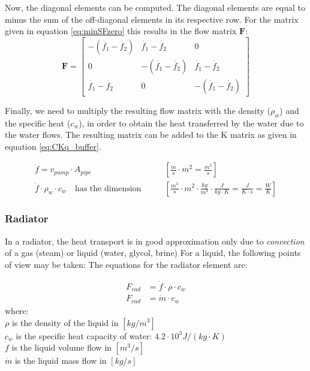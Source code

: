 Now, the diagonal elements can be computed. The diagonal elements are equal to minus the sum of the off-diagonal elements in its respective row. For the matrix given in equation \ref{eq:minSFzero} this results in the flow matrix $\mathbf{F}$:
\begin{equation}
	\mathbf{F} =  \begin{bmatrix}
		-(\dot{f_1}-\dot{f_2})   & \dot{f_1}-\dot{f_2} & 0 \\
        0     & -(\dot{f_1}-\dot{f_2})       & \dot{f_1}-\dot{f_2} \\
     \dot{f_1}-\dot{f_2}  & 0       & -(\dot{f_1}-\dot{f_2})     
	\end{bmatrix}
	\label{eq:flowmatrix}
\end{equation}

Finally, we need to multiply the resulting flow matrix with the density ($\rho_{w}$) and the specific heat ($c_{w}$), in order to obtain the heat transferred by the water due to the water flows. The resulting matrix can be added to the K matrix as given in equation \ref{eq:CKq_buffer}.

\begin{equation}
	\begin{aligned}
		\dot{f} = v_{pump} \cdot A_{pipe} \qquad & \left[ \frac{m}{s} \cdot m^2 = \frac{m^3}{s}\right] \\
		\dot{f} \cdot \rho_w \cdot c_w \quad \text{has the dimension} \qquad & \left[ \frac{m^3}{s} \cdot m^2 \cdot\frac{kg}{m^3} \cdot \frac{J}{kg \cdot K} = \frac{J}{K \cdot s} = \frac{W}{K}\right]
	\end{aligned}
\end{equation}


\subsubsection{Radiator}

In a radiator, the heat transport is in good approximation only due to \emph{convection} of a gas (steam) or liquid (water, glycol, brine) For a liquid, the following points of view may be taken:
The equations for the radiator element are:

{\color{blue}
	\begin{equation}
		\label{eq:radnonlin}
		\begin{aligned}
			F_{rad} &= \dot{f} \cdot \rho \cdot c_w  \\
			F_{rad} &= \dot{m} \cdot c_w  
		\end{aligned}
	\end{equation}
}
where: \\
$\rho$ is the density of the liquid in $[kg/m^3]$ \\
$c_w$ is the specific heat capacity of water: $4.2 \cdot 10^3 J/(kg \cdot K)$ \\
$\dot{f}$ is the liquid volume flow in $[m^3/s]$ \\
$\dot{m}$ is the liquid mass flow in $[kg/s]$ \\

